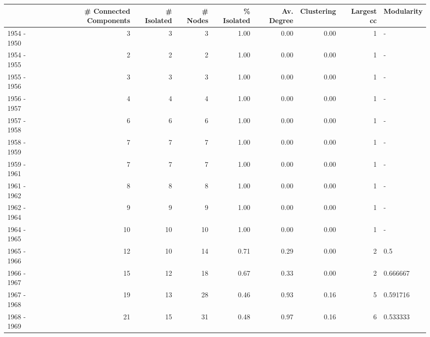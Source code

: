 \begin{tabular}{lrrrrrrrl}
\toprule
{} &  \# Connected Components &  \# Isolated &  \# Nodes &  \% Isolated &  Av. Degree &  Clustering &  Largest cc & Modularity \\
\midrule
1954 - 1950 &                       3 &           3 &        3 &        1.00 &        0.00 &        0.00 &           1 &          - \\
1954 - 1955 &                       2 &           2 &        2 &        1.00 &        0.00 &        0.00 &           1 &          - \\
1955 - 1956 &                       3 &           3 &        3 &        1.00 &        0.00 &        0.00 &           1 &          - \\
1956 - 1957 &                       4 &           4 &        4 &        1.00 &        0.00 &        0.00 &           1 &          - \\
1957 - 1958 &                       6 &           6 &        6 &        1.00 &        0.00 &        0.00 &           1 &          - \\
1958 - 1959 &                       7 &           7 &        7 &        1.00 &        0.00 &        0.00 &           1 &          - \\
1959 - 1961 &                       7 &           7 &        7 &        1.00 &        0.00 &        0.00 &           1 &          - \\
1961 - 1962 &                       8 &           8 &        8 &        1.00 &        0.00 &        0.00 &           1 &          - \\
1962 - 1964 &                       9 &           9 &        9 &        1.00 &        0.00 &        0.00 &           1 &          - \\
1964 - 1965 &                      10 &          10 &       10 &        1.00 &        0.00 &        0.00 &           1 &          - \\
1965 - 1966 &                      12 &          10 &       14 &        0.71 &        0.29 &        0.00 &           2 &        0.5 \\
1966 - 1967 &                      15 &          12 &       18 &        0.67 &        0.33 &        0.00 &           2 &   0.666667 \\
1967 - 1968 &                      19 &          13 &       28 &        0.46 &        0.93 &        0.16 &           5 &   0.591716 \\
1968 - 1969 &                      21 &          15 &       31 &        0.48 &        0.97 &        0.16 &           6 &   0.533333 \\

\end{tabular}

